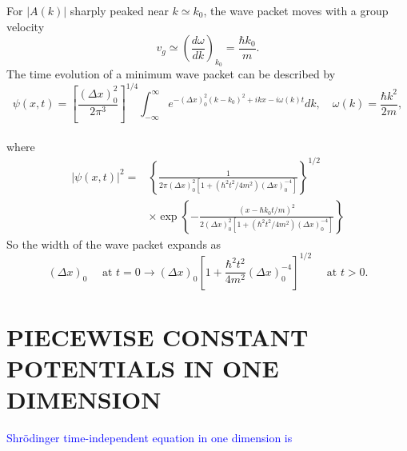 \documentclass{article}
\begin{document}
For $|A(k)|$ sharply peaked near $k \simeq k_{0}$, the wave packet moves with a group velocity
\begin{equation}
v_{g} \simeq\left(\frac{d \omega}{d k}\right)_{k_{0}}=\frac{\hbar k_{0}}{m} .
\end{equation}
The time evolution of a minimum wave packet can be described by
\begin{equation}
\psi(x, t)=\left[\frac{(\Delta x)_{0}^{2}}{2 \pi^{3}}\right]^{1 / 4} \int_{-\infty}^{\infty} e^{-(\Delta x)_{0}^{2}\left(k-k_{0}\right)^{2}+i k x-i \omega(k) t} d k, \quad \omega(k)=\frac{\hbar k^{2}}{2 m},
\end{equation}
\\
where
\begin{equation}
\begin{aligned}
|\psi(x, t)|^{2}=&\left\{\frac{1}{2 \pi(\Delta x)_{0}^{2}\left[1+\left(\hbar^{2} t^{2} / 4 m^{2}\right)(\Delta x)_{0}^{-4}\right]}\right\}^{1 / 2} \\
& \times \exp \left\{-\frac{\left(x-\hbar k_{0} t / m\right)^{2}}{2(\Delta x)_{0}^{2}\left[1+\left(\hbar^{2} t^{2} / 4 m^{2}\right)(\Delta x)_{0}^{-4}\right]}\right\}
\end{aligned}
\end{equation}
So the width of the wave packet expands as
\begin{equation}
(\Delta x)_{0} \quad \text { at } t=0 \rightarrow(\Delta x)_{0}\left[1+\frac{\hbar^{2} t^{2}}{4 m^{2}}(\Delta x)_{0}^{-4}\right]^{1 / 2} \quad \text { at } t>0.
\end{equation}

\section{PIECEWISE CONSTANT POTENTIALS IN ONE DIMENSION}

\textcolor{blue}{Shrödinger time-independent equation in one dimension is}
\end{document}
